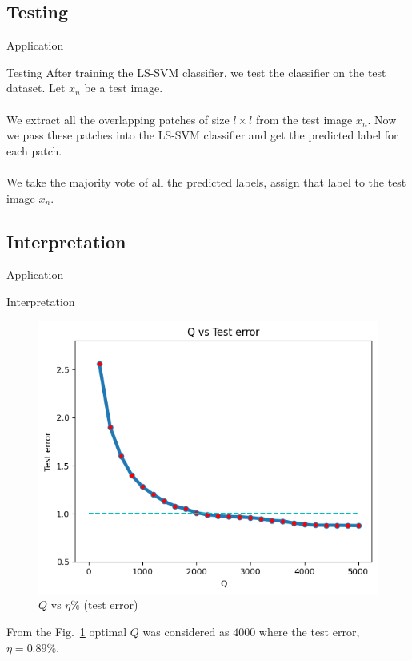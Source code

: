 \documentclass{beamer}
\begin{document}
\subsection{Testing}
\begin{frame}{Application}
\begin{block}{Testing}
    \quad After training the LS-SVM classifier, we test the classifier on the test dataset.
    Let $x_{n}$ be a test image. \\

    \quad \\ \quad We extract all the overlapping patches of size $l \times l$ from the test image $x_{n}$.
    Now we pass these patches into the LS-SVM classifier and get the predicted label for each patch. \\
    \quad \\ \quad We take the majority vote of all the predicted labels, assign that label to the test image $x_{n}$.
    \end{block}
\end{frame}
\subsection{Interpretation}
\begin{frame}{Application}
\begin{block}{Interpretation}
   \begin{figure}[htbp]
            \centering
            \includegraphics[scale=0.38]{output.png} %
            \caption{$Q$ vs $\eta\%$ (test error)}
            \label{fig}
        \end{figure}
    From the Fig.~\ref{fig} optimal $Q$ was considered as $4000$ where the test error, $\eta = 0.89\%$.
\end{block}
\end{frame}
\end{document}

